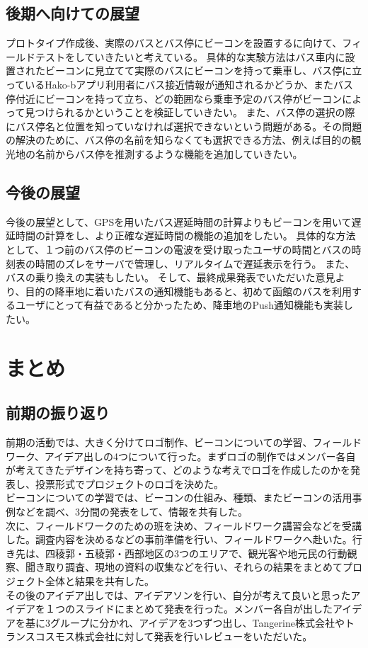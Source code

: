 \documentclass[openany,11pt,papersize]{jsbook}
\begin{document}

\section{後期へ向けての展望}
プロトタイプ作成後、実際のバスとバス停にビーコンを設置するに向けて、フィールドテストをしていきたいと考えている。
具体的な実験方法はバス車内に設置されたビーコンに見立てて実際のバスにビーコンを持って乗車し、バス停に立っているHako-bアプリ利用者にバス接近情報が通知されるかどうか、またバス停付近にビーコンを持って立ち、どの範囲なら乗車予定のバス停がビーコンによって見つけられるかということを検証していきたい。
また、バス停の選択の際にバス停名と位置を知っていなければ選択できないという問題がある。その問題の解決のために、バス停の名前を知らなくても選択できる方法、例えば目的の観光地の名前からバス停を推測するような機能を追加していきたい。


\section{今後の展望}
今後の展望として、GPSを用いたバス遅延時間の計算よりもビーコンを用いて遅延時間の計算をし、より正確な遅延時間の機能の追加をしたい。
具体的な方法として、１つ前のバス停のビーコンの電波を受け取ったユーザの時間とバスの時刻表の時間のズレをサーバで管理し、リアルタイムで遅延表示を行う。
また、バスの乗り換えの実装もしたい。
そして、最終成果発表でいただいた意見より、目的の降車地に着いたバスの通知機能もあると、初めて函館のバスを利用するユーザにとって有益であると分かったため、降車地のPush通知機能も実装したい。



\chapter{まとめ}
\section{前期の振り返り}
前期の活動では、大きく分けてロゴ制作、ビーコンについての学習、フィールドワーク、アイデア出しの4つについて行った。まずロゴの制作ではメンバー各自が考えてきたデザインを持ち寄って、どのような考えでロゴを作成したのかを発表し、投票形式でプロジェクトのロゴを決めた。\\
ビーコンについての学習では、ビーコンの仕組み、種類、またビーコンの活用事例などを調べ、3分間の発表をして、情報を共有した。\\
次に、フィールドワークのための班を決め、フィールドワーク講習会などを受講した。調査内容を決めるなどの事前準備を行い、フィールドワークへ赴いた。行き先は、四稜郭・五稜郭・西部地区の3つのエリアで、観光客や地元民の行動観察、聞き取り調査、現地の資料の収集などを行い、それらの結果をまとめてプロジェクト全体と結果を共有した。\\
その後のアイデア出しでは、アイデアソンを行い、自分が考えて良いと思ったアイデアを１つのスライドにまとめて発表を行った。メンバー各自が出したアイデアを基に3グループに分かれ、アイデアを3つずつ出し、Tangerine株式会社やトランスコスモス株式会社に対して発表を行いレビューをいただいた。
\end{document}
